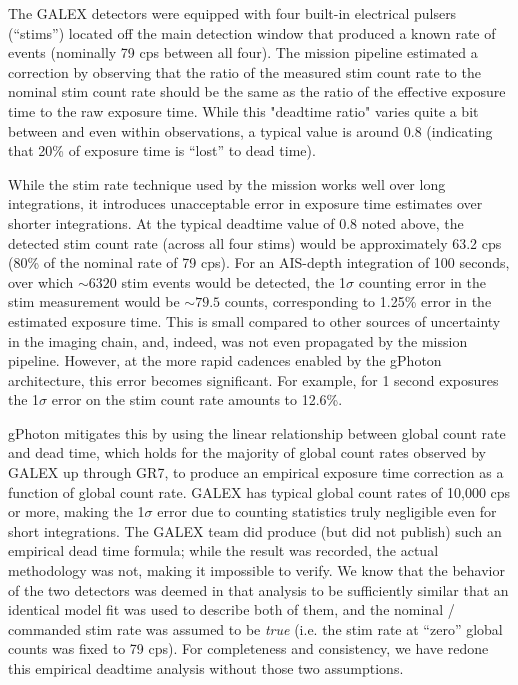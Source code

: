 \documentclass[preprint]{aastex}
\begin{document}
The GALEX detectors were equipped with four built-in electrical pulsers (``stims'') located off the main detection window that produced a known rate of events (nominally 79 cps between all four). The mission pipeline estimated a correction by observing that the ratio of the measured stim count rate to the nominal stim count rate should be the same as the ratio of the effective exposure time to the raw exposure time. While this "deadtime ratio" varies quite a bit between and even within observations, a typical value is around 0.8 (indicating that 20\% of exposure time is ``lost'' to dead time).

While the stim rate technique used by the mission works well over long integrations, it introduces unacceptable error in exposure time estimates over shorter integrations. At the typical deadtime value of 0.8 noted above, the detected stim count rate (across all four stims) would be approximately 63.2 cps (80\% of the nominal rate of 79 cps). For an AIS-depth integration of 100 seconds, over which $\sim 6320$ stim events would be detected, the 1$\sigma$ counting error in the stim measurement would be $\sim 79.5$ counts, corresponding to 1.25\% error in the estimated exposure time. This is small compared to other sources of uncertainty in the imaging chain, and, indeed, was not even propagated by the mission pipeline. However, at the more rapid cadences enabled by the gPhoton architecture, this error becomes significant. For example, for 1 second exposures the 1$\sigma$ error on the stim count rate amounts to 12.6\%.

gPhoton mitigates this by using the linear relationship between global count rate and dead time, which holds for the majority of global count rates observed by GALEX up through GR7, to produce an empirical exposure time correction as a function of global count rate. GALEX has typical global count rates of 10,000 cps or more, making the 1$\sigma$ error due to counting statistics truly negligible even for short integrations. The GALEX team did produce (but did not publish) such an empirical dead time formula; while the result was recorded, the actual methodology was not, making it impossible to verify. We know that the behavior of the two detectors was deemed in that analysis to be sufficiently similar that an identical model fit was used to describe both of them, and the nominal / commanded stim rate was assumed to be \emph{true} (i.e. the stim rate at ``zero'' global counts was fixed to 79 cps). For completeness and consistency, we have redone this empirical deadtime analysis without those two assumptions.
\end{document}
